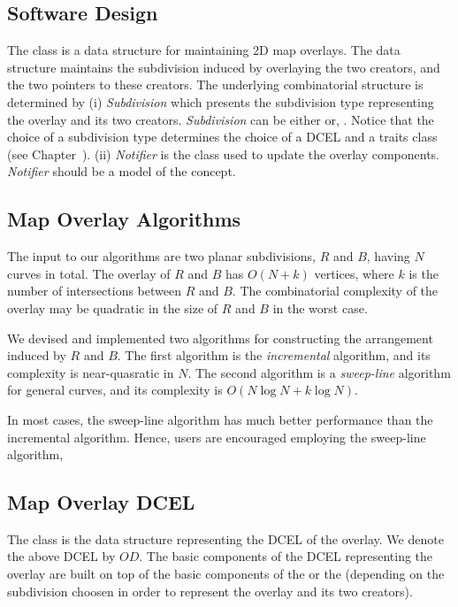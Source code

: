 \begin{ccTexOnly}

\subsection*{Software Design}
The  class 
is a data structure for maintaining 2D map overlays.
The data structure maintains the subdivision induced by overlaying 
the two creators, and the two pointers to these creators. 
The underlying combinatorial structure is determined by
(i) {\it Subdivision} which presents the subdivision type 
representing the overlay and its two creators. 
{\it Subdivision} can be either  or, 
 .
Notice that the choice of a subdivision type determines the choice 
of a DCEL and a traits class (see Chapter~).
(ii) {\it Notifier} is the class used to update the overlay components. 
{\it Notifier} should be a model of the 
 concept.

\subsection*{Map Overlay Algorithms}
\label{sec:algorithms}
The input to our algorithms are two planar subdivisions, 
$R$ and $B$, having $N$ curves in total. 
The overlay of $R$ and $B$ has $O(N+k)$ vertices, 
where $k$ is the number of intersections between $R$ and $B$.
The combinatorial complexity of the overlay may be quadratic 
in the size of $R$ and $B$ in the worst case.

We devised and implemented two algorithms for constructing the 
arrangement induced by $R$ and $B$.
The first algorithm is the {\em incremental} algorithm, 
and its complexity is near-quasratic in $N$. 
The second algorithm is a {\em sweep-line} algorithm 
for general curves, and its complexity is $O(N\log{N} + k\log{N})$.

In most cases, the sweep-line algorithm has much better performance 
than the incremental algorithm. Hence, users are encouraged employing 
the sweep-line algorithm,

\subsection*{Map Overlay DCEL}
\label{sec:dcel}
The 
class is the data structure representing the DCEL of the overlay. 
We denote the above DCEL by $OD$.
The basic components of the DCEL representing the overlay are built 
on top of the basic components of the  or 
the  
(depending on the subdivision choosen in 
order to represent the overlay and its two creators).


\end{ccTexOnly}
